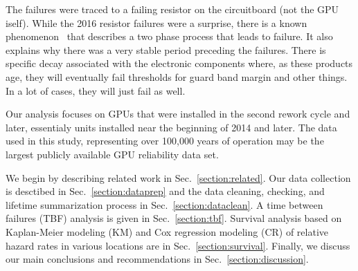 The failures were traced to a failing resistor on the circuitboard
(not the GPU iself). While the 2016 resistor failures were a surprise, there is a known
phenomenon~\cite{referenceneeded} that describes a two phase process
that leads to failure. It also explains why there was a very stable
period preceding the failures. There is specific decay associated
with the electronic components where, as these products age, they will
eventually fail thresholds for guard band margin and other things. In
a lot of cases, they will just fail as well. 

Our analysis focuses on GPUs that were installed in the second rework
cycle and later, essentialy units installed near the beginning of 2014
and later.  The data used in this study, representing over 100,000
years of operation may be the largest publicly available GPU
reliability data set.

We begin by describing related work in Sec.~\ref{section:related}. Our
data collection is desctibed in Sec.~\ref{section:dataprep} and the
data cleaning, checking, and lifetime summarization process in
Sec.~\ref{section:dataclean}. A time between failures (TBF) analysis
is given in Sec.~\ref{section:tbf}. Survival analysis based on
Kaplan-Meier modeling (KM) and Cox regression modeling (CR) of
relative hazard rates in various locations are in
Sec.~\ref{section:survival}. Finally, we discuss our main conclusions
and recommendations in Sec.~\ref{section:discussion}.
 


